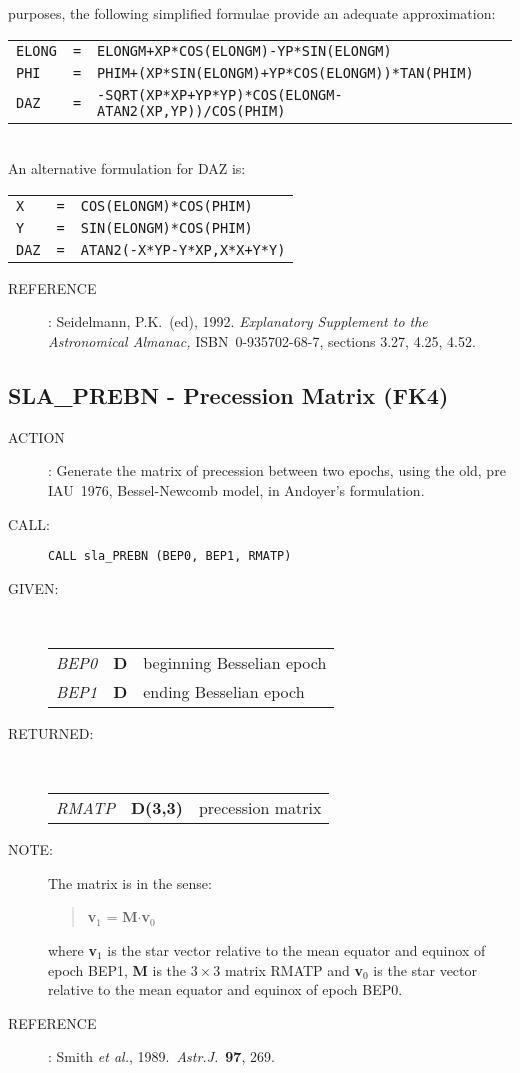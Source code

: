 \documentclass[11pt,twoside]{article}
\newcommand{\xlabel}[1]{}
\newcommand{\routine}[3]
{\hbadness=10000
  \vbox
  {
    \rule{\textwidth}{0.3mm}\\
    {\Large {\bf #1} \hfill #2 \hfill {\bf #1}}\\
    \setlength{\oldspacing}{\topsep}
    \setlength{\topsep}{0.3ex}
    \begin{description}
      #3
    \end{description}
    \setlength{\topsep}{\oldspacing}
  }
}
\renewcommand{\routine}[3]
   {
      \subsection{#1\xlabel{#1} - #2\label{#1}}
       \begin{description}
         #3
       \end{description}
   }
\newcommand{\action}[1]
{\item[ACTION]: #1}
\newcommand{\action}[1]
   {\item[ACTION:] #1}
\newcommand{\call}[1]
{\item[CALL]: \hspace{0.4em}{\tt #1}}
\newlength{\oldspacing}
\renewcommand{\call}[1]
   {
    \item[CALL:] {\tt #1}
   }
\newcommand{\args}[2]
{
  \goodbreak
  \setlength{\oldspacing}{\topsep}
  \setlength{\topsep}{0.3ex}
  \begin{description}
  \item[#1]:\\[1.5ex]
    \begin{tabular}{p{7em}p{6em}p{22em}}
      #2
    \end{tabular}
  \end{description}
  \setlength{\topsep}{\oldspacing}
}
\renewcommand{\args}[2]
   {
     \begin{description}
        \item[#1:]\\
        \begin{tabular}{p{7em}p{6em}l}
           #2
        \end{tabular}
     \end{description}
   }
\newcommand{\spec}[3]
{
  {\em {#1}} & {\bf \mbox{#2}} & {#3}
}
\newcommand{\anote}[1]
{
  \goodbreak
  \setlength{\oldspacing}{\topsep}
  \setlength{\topsep}{0.3ex}
  \begin{description}
    \item[NOTE]:
        #1
  \end{description}
  \setlength{\topsep}{\oldspacing}
}
\renewcommand{\anote}[1]
   {
      \begin{description}
      \item[NOTE:]
          #1
      \end{description}
   }
\newcommand{\aref}[1]
{
  \goodbreak
  \setlength{\oldspacing}{\topsep}
  \setlength{\topsep}{0.3ex}
  \begin{description}
    \item[REFERENCE]:
        #1
  \end{description}
  \setlength{\topsep}{\oldspacing}
}
\newcommand{\aref}[1]
   {
     \begin{description}
       \item[REFERENCE:]
           #1
     \end{description}
   }
\begin{document}
{\begin{enumerate}
      purposes, the following simplified formulae provide an
      adequate approximation: \\[2ex]
      \hspace*{1em}\begin{tabular}{lll}
        {\tt ELONG} & {\tt =} &
             {\tt ELONGM+XP*COS(ELONGM)-YP*SIN(ELONGM)} \\
        {\tt PHI  } & {\tt =} &
             {\tt PHIM+(XP*SIN(ELONGM)+YP*COS(ELONGM))*TAN(PHIM)} \\
        {\tt DAZ  } & {\tt =} &
             {\tt -SQRT(XP*XP+YP*YP)*COS(ELONGM-ATAN2(XP,YP))/COS(PHIM)} \\
      \end{tabular} \\[2ex]
      An alternative formulation for DAZ is:\\[2ex]
      \hspace*{1em}\begin{tabular}{lll}
        {\tt X  } & {\tt =} & {\tt COS(ELONGM)*COS(PHIM)} \\
        {\tt Y  } & {\tt =} & {\tt SIN(ELONGM)*COS(PHIM)} \\
        {\tt DAZ} & {\tt =} & {\tt ATAN2(-X*YP-Y*XP,X*X+Y*Y)} \\
      \end{tabular}
\end{enumerate}
}
\aref{Seidelmann, P.K.\ (ed), 1992.  {\it Explanatory
      Supplement to the Astronomical Almanac,}\/ ISBN~0-935702-68-7,
      sections 3.27, 4.25, 4.52.}
\routine{SLA\_PREBN}{Precession Matrix (FK4)}
{
 \action{Generate the matrix of precession between two epochs,
         using the old, pre IAU~1976, Bessel-Newcomb model, in
         Andoyer's formulation.}
 \call{CALL sla\_PREBN (BEP0, BEP1, RMATP)}
}
\args{GIVEN}
{
 \spec{BEP0}{D}{beginning Besselian epoch} \\
 \spec{BEP1}{D}{ending Besselian epoch}
}
\args{RETURNED}
{
 \spec{RMATP}{D(3,3)}{precession matrix}
}
\anote{The matrix is in the sense:
       \begin{verse}
        {\bf v}$_{1}$ =  {\bf M}$\cdot${\bf v}$_{0}$
       \end{verse}
       where {\bf v}$_{1}$ is the star vector relative to the
       mean equator and equinox of epoch BEP1, {\bf M} is the
       $3\times3$ matrix RMATP and
       {\bf v}$_{0}$ is the star vector relative to the
       mean equator and equinox of epoch BEP0.}
\aref{Smith {\it et al.}, 1989.\ {\it Astr.J.}\ {\bf 97}, 269.}
\end{document}

